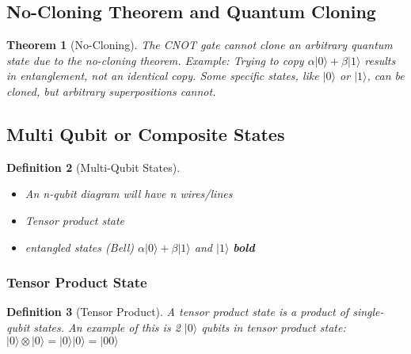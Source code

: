 \documentclass{article}
\newtheorem{theorem}{Theorem}[subsection]
\newtheorem{definition}[theorem]{Definition}
\begin{document}
\subsection{No-Cloning Theorem and Quantum Cloning}
\begin{theorem}[No-Cloning]
The CNOT gate cannot clone an arbitrary quantum state due to the no-cloning theorem. Example: Trying to copy \(\alpha|0\rangle + \beta|1\rangle\) results in entanglement, not an identical copy. Some specific states, like \(|0\rangle\) or \(|1\rangle\), can be cloned, but arbitrary superpositions cannot.
\end{theorem}

\subsection{Multi Qubit or Composite States}
\begin{definition}[Multi-Qubit States]
\begin{itemize}
    \item An n-qubit diagram will have n wires/lines
    \item Tensor product state
    \item entangled states (Bell) \(\alpha|0\rangle + \beta|1\rangle\)  and \(|1\rangle\) \textbf{bold}
\end{itemize}
\end{definition}

\subsubsection{Tensor Product State}
\begin{definition}[Tensor Product]
A tensor product state is a product of single-qubit states. An example of this is 2 \(|0\rangle\) qubits in tensor product state: \(|0\rangle \otimes |0\rangle = |0\rangle |0\rangle = |00\rangle\)
\end{definition}
\end{document}
